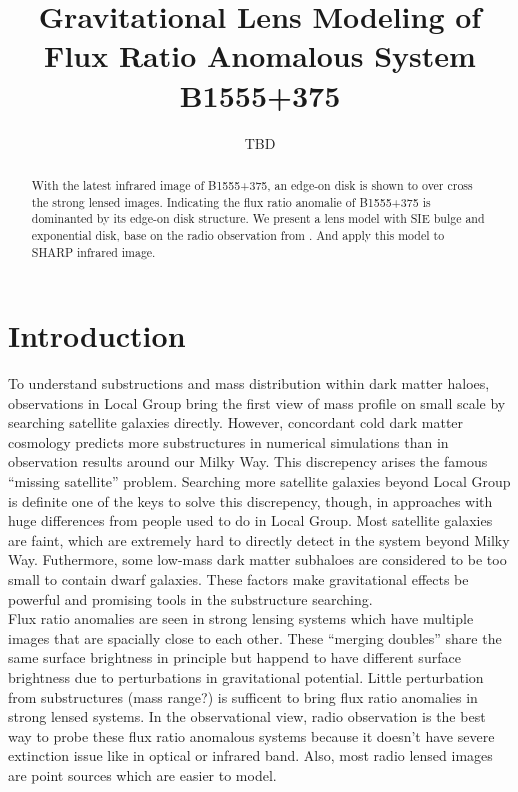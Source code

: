 \documentclass[manuscript]{emulateapj}
\begin{document}
\title{Gravitational Lens Modeling of Flux Ratio Anomalous System B1555+375}
\author{TBD}

\begin{abstract}
With the latest infrared image of B1555+375, an edge-on disk is shown to over cross the strong lensed images. Indicating the flux ratio anomalie of B1555+375 is dominanted by its edge-on disk structure. We present a lens model with SIE bulge and exponential disk, base on the radio observation from \citet{Marlow}. And apply this model to SHARP infrared image.

\end{abstract}


\section{Introduction}
To understand substructions and mass distribution within dark matter haloes, observations in Local Group bring the first view of mass profile on small scale by searching satellite galaxies directly. However, concordant cold dark matter cosmology predicts more substructures in numerical simulations than in observation results around our Milky Way. This discrepency arises the famous ``missing satellite'' problem. Searching more satellite galaxies beyond Local Group is definite one of the keys to solve this discrepency, though, in approaches with huge differences from people used to do in Local Group. Most satellite galaxies are faint, which are extremely hard to directly detect in the system beyond Milky Way. Futhermore, some low-mass dark matter subhaloes are considered to be too small to contain dwarf galaxies. These factors make gravitational effects be powerful and promising tools in the substructure searching.\\   
Flux ratio anomalies are seen in strong lensing systems which have multiple images that are spacially close to each other. These ``merging doubles'' share the same surface brightness in principle but happend to have different surface brightness due to perturbations in gravitational potential. Little perturbation from substructures (mass range?) is sufficent to bring flux ratio anomalies in strong lensed systems. In the observational view, radio observation is the best way to probe these flux ratio anomalous systems because it doesn't have severe extinction issue like in optical or infrared band. Also, most radio lensed images are point sources which are easier to model. \\
\end{document}

